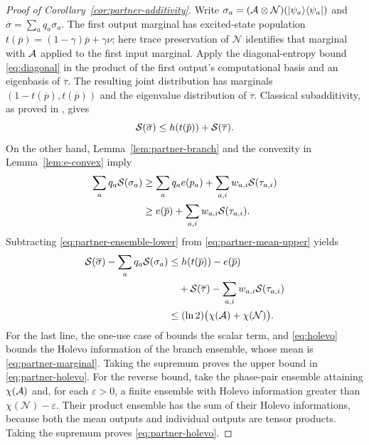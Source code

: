 \begin{proof}[Proof of Corollary~\ref{cor:partner-additivity}]
Write $\sigma_a=(\mathcal A\otimes\mathcal N)(\lvert \psi_a\rangle\langle \psi_a\rvert)$ and
$\overline\sigma=\sum_aq_a\sigma_a$. The first output marginal has
excited-state population $t(\overline p)=(1-\gamma)\overline p+\gamma\nu$;
here trace preservation of $\mathcal N$ identifies that marginal with
$\mathcal A$ applied to the first input marginal. Apply the diagonal-entropy
bound \eqref{eq:diagonal} in the product of the first output's
computational basis and an eigenbasis of $\overline\tau$. The resulting
joint distribution has marginals $(1-t(\overline p),t(\overline p))$
and the eigenvalue distribution of $\overline\tau$. Classical
subadditivity, as proved in , gives
\begin{equation}\label{eq:partner-mean-upper}
 \mathcal S(\overline\sigma)
 \le h(t(\overline p))+\mathcal S(\overline\tau).
\end{equation}
On the other hand, Lemma~\ref{lem:partner-branch} and the convexity in
Lemma~\ref{lem:e-convex} imply
\begin{equation}\label{eq:partner-ensemble-lower}
 \begin{split}
 \sum_aq_a\mathcal S(\sigma_a)
 &\ge\sum_aq_ae(p_a)+\sum_{a,i}w_{a,i}\mathcal S(\tau_{a,i})\\
 &\ge e(\overline p)+\sum_{a,i}w_{a,i}\mathcal S(\tau_{a,i}).
 \end{split}
\end{equation}
Subtracting \eqref{eq:partner-ensemble-lower} from
\eqref{eq:partner-mean-upper} yields
\begin{align*}
 \mathcal S(\overline\sigma)-\sum_aq_a\mathcal S(\sigma_a)
 &\le h(t(\overline p))-e(\overline p)\\
 &\quad+\mathcal S(\overline\tau)-\sum_{a,i}w_{a,i}\mathcal S(\tau_{a,i})\\
 &\le (\ln2)\bigl(\chi(\mathcal A)+\chi(\mathcal N)\bigr).
\end{align*}
For the last line, the one-use case of  bounds the scalar
term, and \eqref{eq:holevo} bounds the Holevo information of the branch
ensemble, whose mean is \eqref{eq:partner-marginal}. Taking the
supremum proves the upper bound in \eqref{eq:partner-holevo}.
For the reverse bound, take the phase-pair ensemble attaining
$\chi(\mathcal A)$ and, for each $\varepsilon>0$, a finite ensemble with
Holevo information greater than $\chi(\mathcal N)-\varepsilon$.
Their product ensemble has the sum of their Holevo informations,
because both the mean outputs and individual outputs are tensor
products. Taking the supremum proves \eqref{eq:partner-holevo}.


\end{proof}
